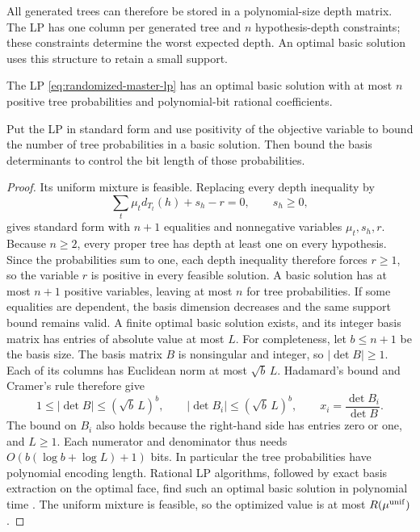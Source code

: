 All generated trees can therefore be stored in a polynomial-size
depth matrix. The LP has one column per generated tree and $n$
hypothesis-depth constraints; these constraints determine the worst
expected depth. An optimal basic solution uses this structure to
retain a small support.
\begin{claim}
\label{clm:randomized-basic-support}
The LP \eqref{eq:randomized-master-lp} has an optimal basic solution
with at most $n$ positive tree probabilities and polynomial-bit
rational coefficients.
\end{claim}
\begin{proofstrategy}
Put the LP in standard form and use positivity of the objective
variable to bound the number of tree probabilities in a basic
solution. Then bound the basis determinants to control the bit length
of those probabilities.
\end{proofstrategy}
\begin{proof}
Its uniform mixture is feasible. Replacing every depth inequality
by
\[
 \sum_t\mu_td_{T_t}(h)+s_h-r=0,\qquad s_h\ge0,
\]
gives standard form with $n+1$ equalities and nonnegative variables
$\mu_t,s_h,r$. Because $n\ge2$, every proper tree has depth at least
one on every hypothesis. Since the probabilities sum to one, each
depth inequality therefore forces $r\ge1$, so the variable $r$ is
positive in every feasible solution. A basic solution has at most
$n+1$ positive variables, leaving at most
$n$ for tree probabilities. If some equalities are dependent, the basis
dimension decreases and the same support bound remains valid. A finite
optimal basic solution exists, and its
integer basis matrix has entries of absolute value at most $L$.
For completeness, let $b\le n+1$ be the basis size. The basis
matrix $B$ is nonsingular and integer, so $|\det B|\ge1$.
Each of its columns has Euclidean norm at most $\sqrt b\,L$.
Hadamard's bound and Cramer's rule therefore give
\[
 1\le|\det B|\le(\sqrt b\,L)^b,\qquad
 |\det B_i|\le(\sqrt b\,L)^b,\qquad
 x_i=\frac{\det B_i}{\det B}.
\]
The bound on $B_i$ also holds because the right-hand side has
entries zero or one, and $L\ge1$. Each numerator and denominator
thus needs $O(b(\log b+\log L)+1)$ bits. In particular the tree
probabilities have polynomial encoding length. Rational LP algorithms,
followed by exact basis extraction on the optimal face, find such
an optimal basic solution in polynomial time
\cite{khachiyan1979}. The uniform mixture is feasible, so the optimized
value is at most $R(\mu^{\rm unif})$.
\end{proof}

